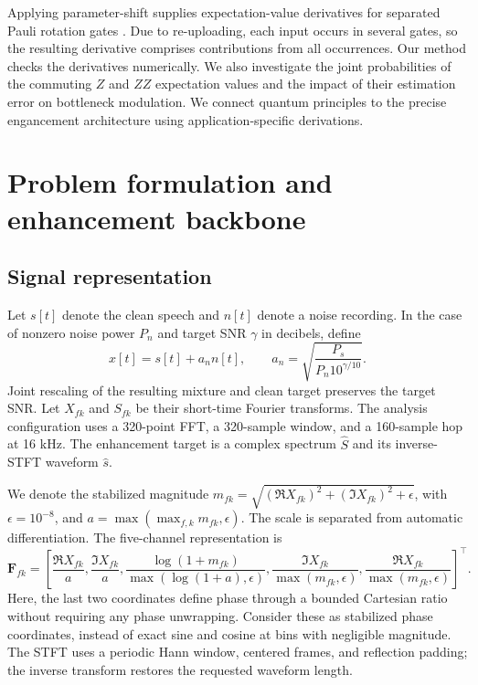\documentclass[10pt,a4paper]{article}
\begin{document}
Applying parameter-shift supplies expectation-value derivatives for separated Pauli rotation gates \cite{gradients}. Due to re-uploading, each input occurs in several gates, so the resulting derivative comprises contributions from all occurrences. Our method checks the derivatives numerically. We also investigate the joint probabilities of the commuting $Z$ and $ZZ$ expectation values and the impact of their estimation error on bottleneck modulation. We connect quantum principles to the precise engancement architecture using application-specific derivations.

\section{Problem formulation and enhancement backbone}
\subsection{Signal representation}
Let $s[t]$ denote the clean speech and $n[t]$ denote a noise recording. In the case of nonzero noise power $P_n$ and target SNR $\gamma$ in decibels, define
\begin{equation}
 x[t]=s[t]+a_n n[t],\qquad
 a_n=\sqrt{\frac{P_s}{P_n10^{\gamma/10}}}.
\end{equation}
Joint rescaling of the resulting mixture and clean target preserves the target SNR. Let $X_{fk}$ and $S_{fk}$ be their short-time Fourier transforms. The analysis configuration uses a 320-point FFT, a 320-sample window, and a 160-sample hop at 16 kHz. The enhancement target is a complex spectrum $\widehat S$ and its inverse-STFT waveform $\widehat s$.

We denote the stabilized magnitude $m_{fk}=\sqrt{(\Re X_{fk})^2+(\Im X_{fk})^2+\epsilon}$, with $\epsilon=10^{-8}$, and $a=\max(\max_{f,k}m_{fk},\epsilon)$. The scale is separated from automatic differentiation. The five-channel representation is
\begin{equation}
\mathbf F_{fk}=\left[
\frac{\Re X_{fk}}a,\frac{\Im X_{fk}}a,
\frac{\log(1+m_{fk})}{\max(\log(1+a),\epsilon)},
\frac{\Im X_{fk}}{\max(m_{fk},\epsilon)},
\frac{\Re X_{fk}}{\max(m_{fk},\epsilon)}
\right]^{\!\top}.
\end{equation}
Here, the last two coordinates define phase through a bounded Cartesian ratio without requiring any phase unwrapping. Consider these as stabilized phase coordinates, instead of exact sine and cosine at bins with negligible magnitude. The STFT uses a periodic Hann window, centered frames, and reflection padding; the inverse transform restores the requested waveform length.
\end{document}
